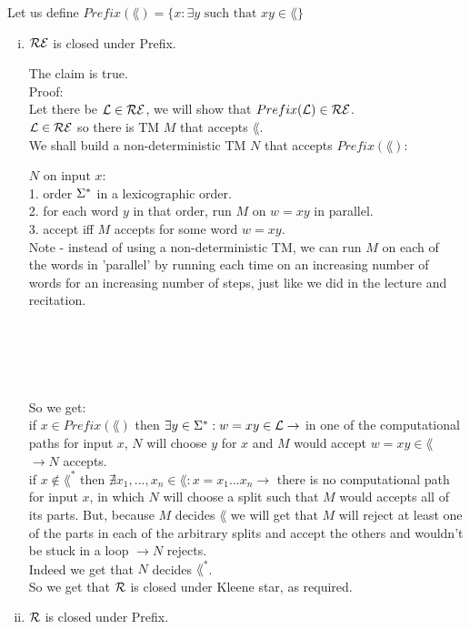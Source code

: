 Let us define $Prefix(\lang) = \{x : \exists y \text{ such that } xy \in \lang\}$

\begin{enumerate}[i.]
    \item $\mathcal{R}\mathcal{E}$ is closed under Prefix.

          The claim is true. \\

          Proof: \\
          Let there be $\mathcal{L} \in \mathcal{R}\mathcal{E}$, we will show that $Prefix(\mathcal{L}) \in \mathcal{R}\mathcal{E}$. \\
          $\mathcal{L} \in \mathcal{R}\mathcal{E}$ so there is TM $M$ that accepts $\lang$. \\
          We shall build a non-deterministic TM $N$ that accepts $Prefix(\lang)$:

          $N \text{ on input } x$: \\
          1. order $\Sigma^*$ in a lexicographic order. \\
          2. for each word $y$ in that order, run $M$ on $w=xy$ in parallel. \\
          3. accept iff $M$ accepts for some word $w=xy$. \\

          Note - instead of using a non-deterministic TM, we can run $M$ on each of \\
          the words in 'parallel' by running each time on an increasing number of \\
          words for an increasing number of steps, just like we did in the lecture and recitation. \\ \\ \\ \\ \\ \\


          \TODO
          So we get: \\
          if $x \in Prefix(\lang)$ then
          $\exists y \in \Sigma^*: w=xy \in \mathcal{L} \rightarrow $ in one of the computational
          paths for input $x$, $N$ will choose $y$ for $x$ and $M$ would accept $w=xy \in \lang$
          $\rightarrow N$ accepts. \\

          if $x \notin \lang^*$  then
          $\nexists x_1,...,x_n \in \lang: x=x_1...x_n \rightarrow $ there is no computational
          path for input $x$, in which $N$ will choose a split such that $M$ would accepts all of its parts.
          But, because $M$ decides $\lang$ we will get that $M$ will reject at least one of the parts in
          each of the arbitrary splits and accept the others and wouldn't be stuck in a loop $\rightarrow N$ rejects. \\

          Indeed we get that $N$ decides $\lang^*$. \\
          So we get that  $\mathcal{R}$ is closed under Kleene star, as required. \\



    \item $\mathcal{R}$ is closed under Prefix.


\end{enumerate}